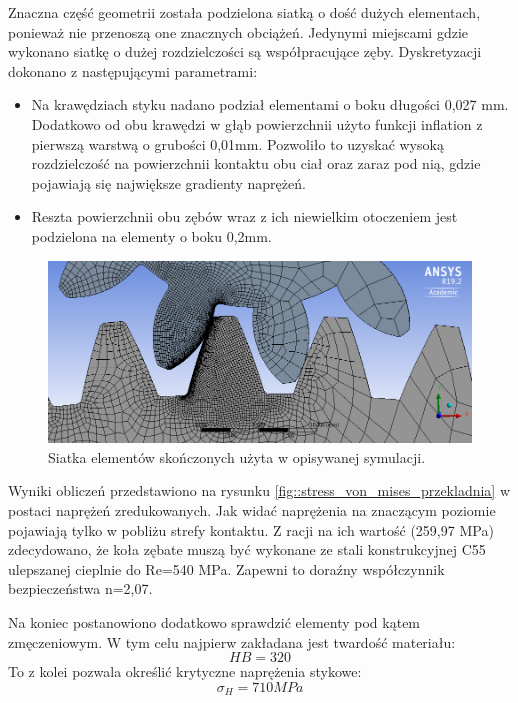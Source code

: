 Znaczna część geometrii została podzielona siatką o dość dużych elementach, ponieważ nie przenoszą one znacznych obciążeń.
Jedynymi miejscami gdzie wykonano siatkę o dużej rozdzielczości są współpracujące zęby.
Dyskretyzacji dokonano z następującymi parametrami:
\begin{itemize}
	\item Na krawędziach styku nadano podział elementami o boku długości 0,027 mm. 
	Dodatkowo od obu krawędzi w głąb powierzchnii użyto funkcji inflation z pierwszą warstwą o grubości 0,01mm.
	Pozwoliło to uzyskać wysoką rozdzielczość na powierzchnii kontaktu obu ciał oraz zaraz pod nią, gdzie pojawiają się największe gradienty naprężeń.
	\item Reszta powierzchnii obu zębów wraz z ich niewielkim otoczeniem jest podzielona na elementy o boku 0,2mm.
	
\end{itemize}

\begin{figure}[bh]
	\centering
	\includegraphics[width=0.9\linewidth]{Obliczenia/siatka_przekladnia}
	\caption{Siatka elementów skończonych użyta w opisywanej symulacji.} 
	\label{fig::mesh_przekladnia}
\end{figure}

Wyniki obliczeń przedstawiono na rysunku \ref{fig::stress_von_mises_przekladnia} w postaci naprężeń zredukowanych.
Jak widać naprężenia na znaczącym poziomie pojawiają tylko w pobliżu strefy kontaktu.
Z racji na ich wartość (259,97 MPa) zdecydowano, że koła zębate muszą być wykonane ze stali konstrukcyjnej C55 ulepszanej cieplnie do Re=540 MPa.
Zapewni to doraźny współczynnik bezpieczeństwa n=2,07.

Na koniec postanowiono dodatkowo sprawdzić elementy pod kątem zmęczeniowym.
W tym celu najpierw zakładana jest twardość materiału:
\begin{equation}
HB=320
\end{equation} 
To z kolei pozwala określić krytyczne naprężenia stykowe:
\begin{equation}
\sigma_H = 710MPa
\end{equation} 

